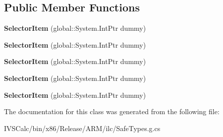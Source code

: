 \subsection*{Public Member Functions}
\begin{DoxyCompactItemize}
\item 
\mbox{\label{class_windows_1_1_u_i_1_1_xaml_1_1_controls_1_1_primitives_1_1_selector_item_ac55a89653a3a6a7a918562a035f13eb0}} 
{\bfseries Selector\+Item} (global\+::\+System.\+Int\+Ptr dummy)
\item 
\mbox{\label{class_windows_1_1_u_i_1_1_xaml_1_1_controls_1_1_primitives_1_1_selector_item_ac55a89653a3a6a7a918562a035f13eb0}} 
{\bfseries Selector\+Item} (global\+::\+System.\+Int\+Ptr dummy)
\item 
\mbox{\label{class_windows_1_1_u_i_1_1_xaml_1_1_controls_1_1_primitives_1_1_selector_item_ac55a89653a3a6a7a918562a035f13eb0}} 
{\bfseries Selector\+Item} (global\+::\+System.\+Int\+Ptr dummy)
\item 
\mbox{\label{class_windows_1_1_u_i_1_1_xaml_1_1_controls_1_1_primitives_1_1_selector_item_ac55a89653a3a6a7a918562a035f13eb0}} 
{\bfseries Selector\+Item} (global\+::\+System.\+Int\+Ptr dummy)
\item 
\mbox{\label{class_windows_1_1_u_i_1_1_xaml_1_1_controls_1_1_primitives_1_1_selector_item_ac55a89653a3a6a7a918562a035f13eb0}} 
{\bfseries Selector\+Item} (global\+::\+System.\+Int\+Ptr dummy)
\end{DoxyCompactItemize}


The documentation for this class was generated from the following file\+:\begin{DoxyCompactItemize}
\item 
I\+V\+S\+Calc/bin/x86/\+Release/\+A\+R\+M/ilc/Safe\+Types.\+g.\+cs\end{DoxyCompactItemize}
